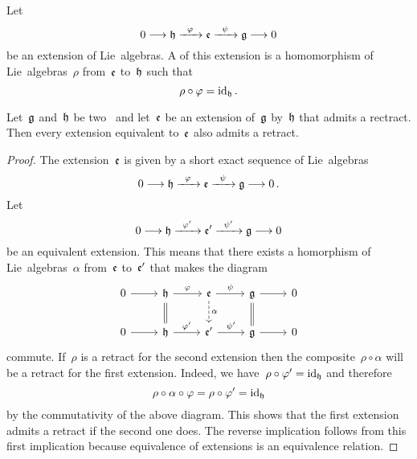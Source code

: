 \begin{definition}
	Let
	\[
		0
		\to
		\hlie
		\xto{\varphi}
		\elie
		\xto{\psi}
		\glie
		\to
		0
	\]
	be an extension of Lie~algebras.
	A  of this extension is a homomorphism of Lie~algebras~$\rho$ from~$\mathfrak{e}$ to~$\mathfrak{h}$ such that
	\[
		\rho \circ \varphi
		=
		\mathrm{id}_{\mathfrak{h}} \,.
	\]
\end{definition}


\begin{lemma}
	\label{having a retract is invariant under equivalence of extensions}
	Let~$\mathfrak{g}$ and~$\mathfrak{h}$ be two~\liealgebras{$\kf$} and let~$\mathfrak{e}$ be an extension of~$\mathfrak{g}$ by~$\mathfrak{h}$ that admits a rectract.
	Then every extension equivalent to~$\mathfrak{e}$ also admits a retract.
\end{lemma}


\begin{proof}
	The extension~$\mathfrak{e}$ is given by a short exact sequence of Lie~algebras
	\[
		0
		\to
		\hlie
		\xto{\varphi}
		\elie
		\xto{\psi}
		\glie
		\to
		0 \,.
	\]
	Let
	\[
		0
		\to
		\hlie
		\xto{\varphi'}
		\elie'
		\xto{\psi'}
		\glie
		\to
		0
	\]
	be an equivalent extension.
	This means that there exists a homorphism of Lie~algebras~$\alpha$ from~$\mathfrak{e}$ to~$\mathfrak{e}'$ that makes the diagram
	\[
		\begin{tikzcd}
			0
			\arrow{r}
			&
			\hlie
			\arrow{r}[above]{\varphi}
			\arrow[equal]{d}
			&
			\elie
			\arrow{r}[above]{\psi}
			\arrow[dashed]{d}[right]{\alpha}
			&
			\glie
			\arrow{r}
			\arrow[equal]{d}
			&
			0
			\\
			0
			\arrow{r}
			&
			\hlie
			\arrow{r}[above]{\varphi'}
			&
			\elie'
			\arrow{r}[above]{\psi'}
			&
			\glie
			\arrow{r}
			&
			0
		\end{tikzcd}
	\]
	commute.
	If~$\rho$ is a retract for the second extension then the composite~$\rho \circ \alpha$ will be a retract for the first extension.
	Indeed, we have~$\rho \circ \varphi' = \mathrm{id}_{\mathfrak{h}}$ and therefore
	\[
		\rho \circ \alpha \circ \varphi
		=
		\rho \circ \varphi'
		=
		\mathrm{id}_{\mathfrak{h}}
	\]
	by the commutativity of the above diagram.
	This shows that the first extension admits a retract if the second one does.
	The reverse implication follows from this first implication because equivalence of extensions is an equivalence relation.
\end{proof}


